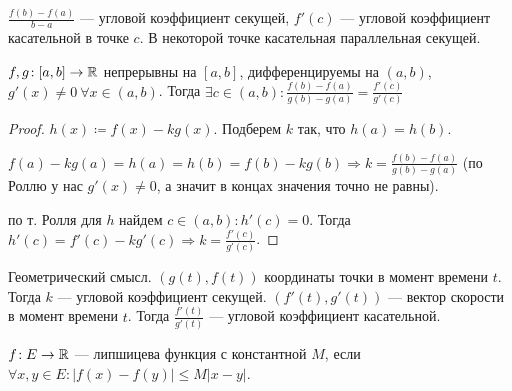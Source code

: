 \begin{remark}
    $\frac{f(b) - f(a)}{b - a}$ --- угловой коэффициент секущей, $f'(c)$ --- угловой коэффициент касательной в точке  $c$. В некоторой точке касательная параллельная секущей. 
\end{remark}
\begin{theorem}
    $f, g\!:[a, b] \to \mathbb{R}$ непрерывны на  $[a, b]$, дифференцируемы на  $(a, b)$,  $g'(x) \neq 0\ \forall x\in(a, b)$. Тогда $\exists c \in (a, b)\!: \frac{f(b) - f(a)}{g(b) - g(a)} = \frac{f'(c)}{g'(c)}$
\end{theorem}
\begin{proof}
    $h(x) \coloneqq f(x) - kg(x)$. Подберем $k$ так, что  $h(a) = h(b)$.

    $f(a) - kg(a) = h(a) = h(b) = f(b) - kg(b) \Rightarrow k = \frac{f(b) - f(a)}{g(b) - g(a)}$ (по Роллю у нас $g'(x) \neq 0$, а значит в концах значения точно не равны).

    по т. Ролля для $h$ найдем  $c \in (a, b)\!: h'(c) = 0$. Тогда  $h'(c) = f'(c) - kg'(c) \Rightarrow k = \frac{f'(c)}{g'(c)}$.
\end{proof}
\begin{remark}
    Геометрический смысл. $(g(t), f(t))$ координаты точки в момент времени  $t$. Тогда  $k$ --- угловой коэффициент секущей. $(f'(t), g'(t))$ --- вектор скорости в момент времени  $t$. Тогда $\frac{f'(t)}{g'(t)}$ --- угловой коэффициент касательной. 
\end{remark}
\begin{definition}
    $f\!:E\to \mathbb{R}$ --- липшицева функция с константной $M$, если  $\forall x, y \in E\!: |f(x) - f(y)| \le M|x-y|$.
\end{definition}
